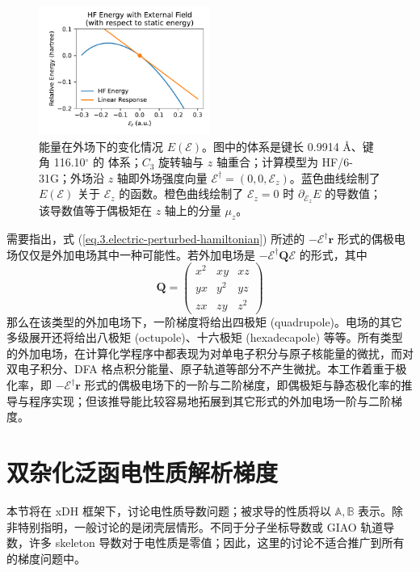 \begin{figure}
  \centering
  \caption{能量在外场下的变化情况 $E(\pmb{\mathcal{E}})$。图中的体系是键长 0.9914 \AA、键角 116.10$^\circ$ 的  体系；$C_3$ 旋转轴与 $z$ 轴重合；计算模型为 HF/6-31G；外场沿 $z$ 轴即外场强度向量 $\pmb{\mathcal{E}}^\dagger = (0, 0, \mathcal{E}_z)$。蓝色曲线绘制了 $E(\pmb{\mathcal{E}})$ 关于 $\mathcal{E}_z$ 的函数。橙色曲线绘制了 $\mathcal{E}_z = 0$ 时 $\partial_{\mathcal{E}_z} E$ 的导数值；该导数值等于偶极矩在 $z$ 轴上的分量 $\mu_z$。}
  \label{fig.3.NumDipole-z}
  \includegraphics[width=0.5\textwidth]{assets/NumDipole-z.pdf}
\end{figure}

需要指出，式 (\ref{eq.3.electric-perturbed-hamiltonian}) 所述的 $- \pmb{\mathcal{E}}^\dagger \bm{r}$ 形式的偶极电场仅仅是外加电场其中一种可能性。若外加电场是 $- \pmb{\mathcal{E}}^\dagger \bm{Q} \pmb{\mathcal{E}}$ 的形式，其中
\begin{equation*}
  \bm{Q} =
  \begin{pmatrix}
    x^2 & xy & xz \\
    yx & y^2 & yz \\
    zx & zy & z^2
  \end{pmatrix}
\end{equation*}
那么在该类型的外加电场下，一阶梯度将给出四极矩 (quadrupole)。电场的其它多级展开还将给出八极矩 (octupole)、十六极矩 (hexadecapole) 等等。所有类型的外加电场，在计算化学程序中都表现为对单电子积分与原子核能量的微扰，而对双电子积分、DFA 格点积分能量、原子轨道等部分不产生微扰。本工作着重于极化率，即 $- \pmb{\mathcal{E}}^\dagger \bm{r}$ 形式的偶极电场下的一阶与二阶梯度，即偶极矩与静态极化率的推导与程序实现；但该推导能比较容易地拓展到其它形式的外加电场一阶与二阶梯度。

\section{双杂化泛函电性质解析梯度}
\label{sec.3.3.theory}

本节将在 xDH 框架下，讨论电性质导数问题；被求导的性质将以 $\mathbb{A}, \mathbb{B}$ 表示。除非特别指明，一般讨论的是闭壳层情形。不同于分子坐标导数或 GIAO 轨道导数，许多 skeleton 导数对于电性质是零值；因此，这里的讨论不适合推广到所有的梯度问题中。

